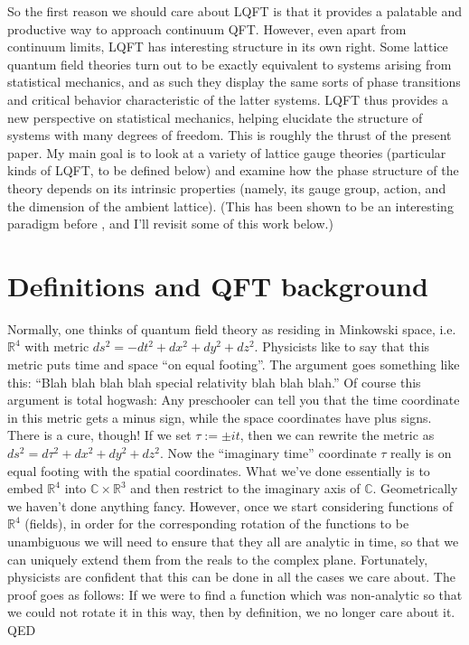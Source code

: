 \documentclass[9pt,twocolumn,twoside]{article}
\begin{document}
So the first reason we should care about LQFT is that it provides a palatable and productive way to approach continuum QFT.  However, even apart from continuum limits, LQFT has interesting structure in its own right.  Some lattice quantum field theories turn out to be exactly equivalent to systems arising from statistical mechanics, and as such they display the same sorts of phase transitions and critical behavior characteristic of the latter systems.  LQFT thus provides a new perspective on statistical mechanics, helping elucidate the structure of systems with many degrees of freedom.  This is roughly the thrust of the present paper.  My main goal is to look at a variety of lattice gauge theories (particular kinds of LQFT, to be defined below) and examine how the phase structure of the theory depends on its intrinsic properties (namely, its gauge group, action, and the dimension of the ambient lattice).  (This has been shown to be an interesting paradigm before \cite{Creutz,DAdda,Rebbi,Grosse}, and I'll revisit some of this work below.)

\section{Definitions and QFT background}
Normally, one thinks of quantum field theory as residing in Minkowski space, i.e. $\mathbb{R}^4$ with metric $ds^2 = -dt^2 + dx^2 + dy^2 + dz^2$.  Physicists like to say that this metric puts time and space ``on equal footing''.  The argument goes something like this: ``Blah blah blah blah special relativity blah blah blah.''  Of course this argument is total hogwash: Any preschooler can tell you that the time coordinate in this metric gets a minus sign, while the space coordinates have plus signs.  There is a cure, though!  If we set $\tau := \pm i t$, then we can rewrite the metric as $ds^2 = d\tau^2 + dx^2 + dy^2 + dz^2$.  Now the ``imaginary time'' coordinate $\tau$ really is on equal footing with the spatial coordinates.  What we've done essentially is to embed $\mathbb{R}^4$ into $\mathbb{C}\times \mathbb{R}^3$ and then restrict to the imaginary axis of $\mathbb{C}$.  Geometrically we haven't done anything fancy.  However, once we start considering functions of $\mathbb{R}^4$ (fields), in order for the corresponding rotation of the functions to be unambiguous we will need to ensure that they all are analytic in time, so that we can uniquely extend them from the reals to the complex plane.  Fortunately, physicists are confident that this can be done in all the cases we care about.  The proof goes as follows: If we were to find a function which was non-analytic so that we could not rotate it in this way, then by definition, we no longer care about it.  QED
\end{document}

